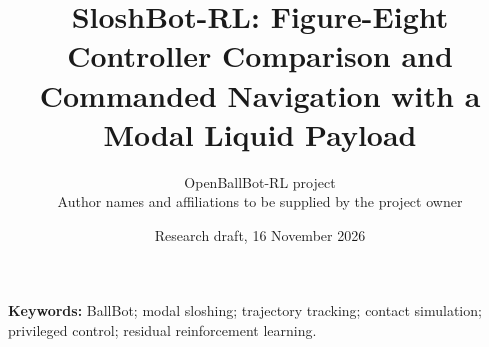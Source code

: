 \documentclass[10pt,twocolumn]{article}
\title{SloshBot-RL: Figure-Eight Controller Comparison and Commanded Navigation with a Modal Liquid Payload}
\author{OpenBallBot-RL project\\Author names and affiliations to be supplied by the project owner}
\date{Research draft, 16 November 2026}
\begin{document}
\maketitle

\noindent\textbf{Keywords:} BallBot; modal sloshing; trajectory tracking; contact simulation; privileged control; residual reinforcement learning.















\appendix

\end{document}
